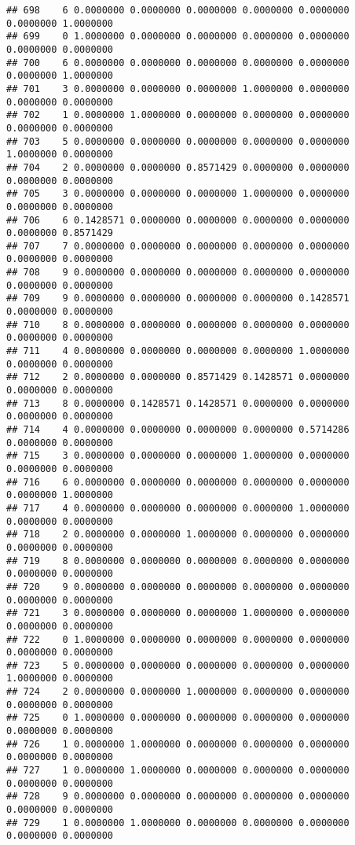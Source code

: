 \documentclass[
]{article}
\begin{document}
\begin{verbatim}
## 698    6 0.0000000 0.0000000 0.0000000 0.0000000 0.0000000 0.0000000 1.0000000
## 699    0 1.0000000 0.0000000 0.0000000 0.0000000 0.0000000 0.0000000 0.0000000
## 700    6 0.0000000 0.0000000 0.0000000 0.0000000 0.0000000 0.0000000 1.0000000
## 701    3 0.0000000 0.0000000 0.0000000 1.0000000 0.0000000 0.0000000 0.0000000
## 702    1 0.0000000 1.0000000 0.0000000 0.0000000 0.0000000 0.0000000 0.0000000
## 703    5 0.0000000 0.0000000 0.0000000 0.0000000 0.0000000 1.0000000 0.0000000
## 704    2 0.0000000 0.0000000 0.8571429 0.0000000 0.0000000 0.0000000 0.0000000
## 705    3 0.0000000 0.0000000 0.0000000 1.0000000 0.0000000 0.0000000 0.0000000
## 706    6 0.1428571 0.0000000 0.0000000 0.0000000 0.0000000 0.0000000 0.8571429
## 707    7 0.0000000 0.0000000 0.0000000 0.0000000 0.0000000 0.0000000 0.0000000
## 708    9 0.0000000 0.0000000 0.0000000 0.0000000 0.0000000 0.0000000 0.0000000
## 709    9 0.0000000 0.0000000 0.0000000 0.0000000 0.1428571 0.0000000 0.0000000
## 710    8 0.0000000 0.0000000 0.0000000 0.0000000 0.0000000 0.0000000 0.0000000
## 711    4 0.0000000 0.0000000 0.0000000 0.0000000 1.0000000 0.0000000 0.0000000
## 712    2 0.0000000 0.0000000 0.8571429 0.1428571 0.0000000 0.0000000 0.0000000
## 713    8 0.0000000 0.1428571 0.1428571 0.0000000 0.0000000 0.0000000 0.0000000
## 714    4 0.0000000 0.0000000 0.0000000 0.0000000 0.5714286 0.0000000 0.0000000
## 715    3 0.0000000 0.0000000 0.0000000 1.0000000 0.0000000 0.0000000 0.0000000
## 716    6 0.0000000 0.0000000 0.0000000 0.0000000 0.0000000 0.0000000 1.0000000
## 717    4 0.0000000 0.0000000 0.0000000 0.0000000 1.0000000 0.0000000 0.0000000
## 718    2 0.0000000 0.0000000 1.0000000 0.0000000 0.0000000 0.0000000 0.0000000
## 719    8 0.0000000 0.0000000 0.0000000 0.0000000 0.0000000 0.0000000 0.0000000
## 720    9 0.0000000 0.0000000 0.0000000 0.0000000 0.0000000 0.0000000 0.0000000
## 721    3 0.0000000 0.0000000 0.0000000 1.0000000 0.0000000 0.0000000 0.0000000
## 722    0 1.0000000 0.0000000 0.0000000 0.0000000 0.0000000 0.0000000 0.0000000
## 723    5 0.0000000 0.0000000 0.0000000 0.0000000 0.0000000 1.0000000 0.0000000
## 724    2 0.0000000 0.0000000 1.0000000 0.0000000 0.0000000 0.0000000 0.0000000
## 725    0 1.0000000 0.0000000 0.0000000 0.0000000 0.0000000 0.0000000 0.0000000
## 726    1 0.0000000 1.0000000 0.0000000 0.0000000 0.0000000 0.0000000 0.0000000
## 727    1 0.0000000 1.0000000 0.0000000 0.0000000 0.0000000 0.0000000 0.0000000
## 728    9 0.0000000 0.0000000 0.0000000 0.0000000 0.0000000 0.0000000 0.0000000
## 729    1 0.0000000 1.0000000 0.0000000 0.0000000 0.0000000 0.0000000 0.0000000

\end{verbatim}
\end{document}
